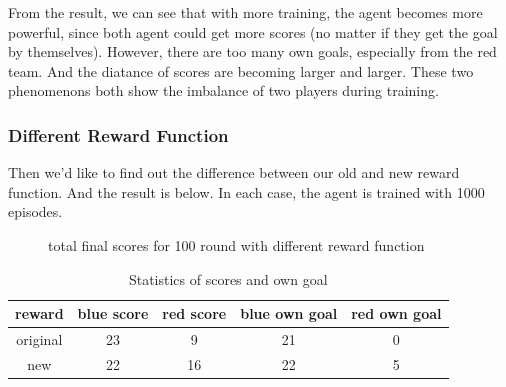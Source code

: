 \documentclass[12pt]{article}
\begin{document}
 From the result, we can see that with more training, the agent becomes more powerful, since both agent could get more scores (no matter if they get the goal by themselves). However, there are too many own goals, especially from the red team. And the diatance of scores are becoming larger and larger. These two phenomenons both show the imbalance of two players during training.

\subsubsection{Different Reward Function}
Then we'd like to find out the difference between our old and new reward function. And the result is below. In each case, the agent is trained with 1000 episodes.

\begin{figure}[htbp]
	\centering
	\caption{total final scores for 100 round with different reward function}
\end{figure}

\begin{table}[H]
	\begin{center}
		\begin{tabular}{|c|c|c|c|c|}
			\hline
			reward  & blue score & red score & blue own goal & red own goal \\ \hline
			original  & 23   & 9    & 21   & 0    \\ \hline
			new       & 22   & 16   & 22   & 5    \\ \hline
		\end{tabular}
		\caption{Statistics of scores and own goal}
	\end{center}
\end{table}  
\end{document}
